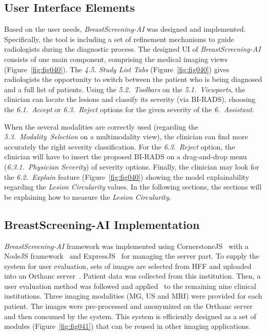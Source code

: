 \subsection{User Interface Elements}
\label{sec:app003003002}

Based on the user needs, {\it BreastScreening-AI} was designed and implemented.
Specifically, the tool is including a set of refinement mechanisms to guide radiologists during the diagnostic process.
The designed \ac{UI} of {\it BreastScreening-AI} consists of one main component, comprising the medical imaging views (Figure~\ref{fig:fig040}).
The {\it 4.5. Study List Tabs} (Figure~\ref{fig:fig040}) gives radiologists the opportunity to switch between the patient who is being diagnosed and a full list of patients.
Using the {\it 5.2.~Toolbars} on the {\it 5.1.~Viewports}, the clinician can locate the lesions and classify its severity (via \ac{BI-RADS}), choosing the {\it 6.1.~Accept} or {\it 6.3.~Reject} options for the given severity of the {\it 6.~Assistant}.

When the several modalities are correctly used (regarding the {\it 5.3.~Modality~Selection} on a multimodality view), the clinician can find more accurately the right severity classification.
For the {\it 6.3.~Reject} option, the clinician will have to insert the proposed \ac{BI-RADS} on a drag-and-drop menu ({\it 6.3.1.~Physician Severity}) of severity options.
Finally, the clinician may look for the {\it 6.2.~Explain} feature (Figure~\ref{fig:fig040}) showing the model explainability regarding the {\it Lesion Circularity} values.
In the following sections, the sections will be explaining how to measure the {\it Lesion Circularity}.

\subsection{BreastScreening-AI Implementation}
\label{sec:app003003003}

{\it BreastScreening-AI} framework was implemented using CornerstoneJS\footnotemark[18]~\cite{urban2017lesiontracker} with a NodeJS framework\footnotemark[19]~\cite{drnasin2017javascript} and ExpressJS\footnotemark[20]~\cite{gustin2017empowerment} for managing the server part.
To supply the system for user evaluation, sets of images are selected from \ac{HFF} and uploaded into an Orthanc server~\cite{Jodogne2018}.
Patient data was collected from this institution.
Then, a user evaluation method was followed and applied~\cite{CALISTO2021102607} to the remaining nine clinical institutions.
Three imaging modalities (\ac{MG}, \ac{US} and \ac{MRI}) were provided for each patient.
The images were pre-processed and anonymized on the Orthanc server and then consumed by the system.
This system is efficiently designed as a set of modules (Figure~\ref{fig:fig041}) that can be reused in other imaging applications.


